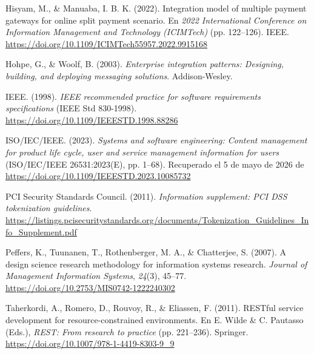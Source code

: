 \noindent Hisyam, M., \& Manuaba, I. B. K. (2022). Integration model of multiple payment gateways for online split payment scenario. En \textit{2022 International Conference on Information Management and Technology (ICIMTech)} (pp. 122--126). IEEE. \url{https://doi.org/10.1109/ICIMTech55957.2022.9915168}

\noindent Hohpe, G., \& Woolf, B. (2003). \textit{Enterprise integration patterns: Designing, building, and deploying messaging solutions}. Addison-Wesley.

\noindent IEEE. (1998). \textit{IEEE recommended practice for software requirements specifications} (IEEE Std 830-1998). \url{https://doi.org/10.1109/IEEESTD.1998.88286}

\noindent ISO/IEC/IEEE. (2023). \textit{Systems and software engineering: Content management for product life cycle, user and service management information for users} (ISO/IEC/IEEE 26531:2023(E), pp. 1--68). Recuperado el 5 de mayo de 2026 de \url{https://doi.org/10.1109/IEEESTD.2023.10085732}

\noindent PCI Security Standards Council. (2011). \textit{Information supplement: PCI DSS tokenization guidelines}. \url{https://listings.pcisecuritystandards.org/documents/Tokenization_Guidelines_Info_Supplement.pdf}

\noindent Peffers, K., Tuunanen, T., Rothenberger, M. A., \& Chatterjee, S. (2007). A design science research methodology for information systems research. \textit{Journal of Management Information Systems}, \textit{24}(3), 45--77. \url{https://doi.org/10.2753/MIS0742-1222240302}

\noindent Taherkordi, A., Romero, D., Rouvoy, R., \& Eliassen, F. (2011). RESTful service development for resource-constrained environments. En E. Wilde \& C. Pautasso (Eds.), \textit{REST: From research to practice} (pp. 221--236). Springer. \url{https://doi.org/10.1007/978-1-4419-8303-9_9}

\endgroup
